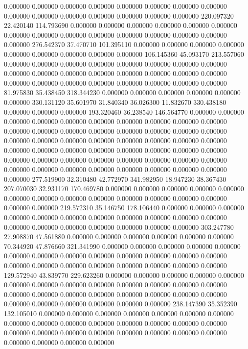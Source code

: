 0.000000 0.000000 0.000000
0.000000 0.000000 0.000000
0.000000 0.000000 0.000000
0.000000 0.000000 0.000000
0.000000 0.000000 0.000000
220.097320 22.420140 114.793690
0.000000 0.000000 0.000000
0.000000 0.000000 0.000000
0.000000 0.000000 0.000000
0.000000 0.000000 0.000000
0.000000 0.000000 0.000000
276.542370 37.470710 101.395110
0.000000 0.000000 0.000000
0.000000 0.000000 0.000000
0.000000 0.000000 0.000000
106.145360 45.093170 213.557060
0.000000 0.000000 0.000000
0.000000 0.000000 0.000000
0.000000 0.000000 0.000000
0.000000 0.000000 0.000000
0.000000 0.000000 0.000000
0.000000 0.000000 0.000000
0.000000 0.000000 0.000000
0.000000 0.000000 0.000000
81.975830 35.438450 318.344230
0.000000 0.000000 0.000000
0.000000 0.000000 0.000000
330.131120 35.601970 31.840340
36.026300 11.832670 330.438180
0.000000 0.000000 0.000000
193.320460 36.238540 146.564770
0.000000 0.000000 0.000000
0.000000 0.000000 0.000000
0.000000 0.000000 0.000000
0.000000 0.000000 0.000000
0.000000 0.000000 0.000000
0.000000 0.000000 0.000000
0.000000 0.000000 0.000000
0.000000 0.000000 0.000000
0.000000 0.000000 0.000000
0.000000 0.000000 0.000000
0.000000 0.000000 0.000000
0.000000 0.000000 0.000000
0.000000 0.000000 0.000000
0.000000 0.000000 0.000000
0.000000 0.000000 0.000000
0.000000 0.000000 0.000000
0.000000 0.000000 0.000000
277.519900 32.310480 42.772970
341.982950 18.947230 38.367430
207.070030 32.931170 170.469780
0.000000 0.000000 0.000000
0.000000 0.000000 0.000000
0.000000 0.000000 0.000000
0.000000 0.000000 0.000000
0.000000 0.000000 0.000000
219.572310 35.146750 178.106440
0.000000 0.000000 0.000000
0.000000 0.000000 0.000000
0.000000 0.000000 0.000000
0.000000 0.000000 0.000000
0.000000 0.000000 0.000000
0.000000 0.000000 0.000000
303.247780 27.908870 47.561880
0.000000 0.000000 0.000000
0.000000 0.000000 0.000000
70.344920 47.876660 321.341990
0.000000 0.000000 0.000000
0.000000 0.000000 0.000000
0.000000 0.000000 0.000000
0.000000 0.000000 0.000000
0.000000 0.000000 0.000000
0.000000 0.000000 0.000000
0.000000 0.000000 0.000000
129.572940 43.839770 229.623260
0.000000 0.000000 0.000000
0.000000 0.000000 0.000000
0.000000 0.000000 0.000000
0.000000 0.000000 0.000000
0.000000 0.000000 0.000000
0.000000 0.000000 0.000000
0.000000 0.000000 0.000000
0.000000 0.000000 0.000000
0.000000 0.000000 0.000000
238.147390 35.352390 132.105010
0.000000 0.000000 0.000000
0.000000 0.000000 0.000000
0.000000 0.000000 0.000000
0.000000 0.000000 0.000000
0.000000 0.000000 0.000000
0.000000 0.000000 0.000000
0.000000 0.000000 0.000000
0.000000 0.000000 0.000000
0.000000 0.000000 0.000000
